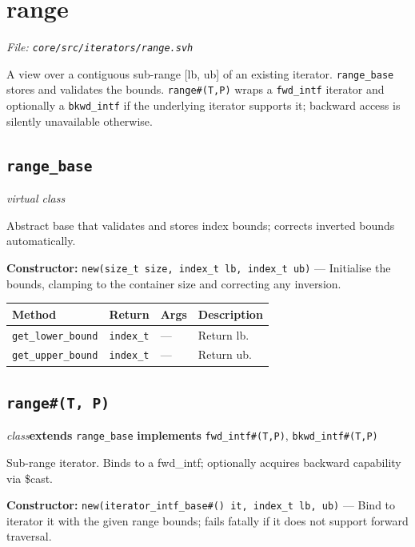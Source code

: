 \documentclass[11pt,letterpaper]{report}
\begin{document}
\section{range}
\noindent\small\textit{File: \texttt{core/src/iterators/range.svh}}\par

A view over a contiguous sub-range [lb, ub] of an existing iterator. \texttt{range\_base} stores and validates the bounds. \texttt{range\#(T,P)} wraps a \texttt{fwd\_intf} iterator and optionally a \texttt{bkwd\_intf} if the underlying iterator supports it; backward access is silently unavailable otherwise.

\subsection*{\texttt{range\_base}}
\noindent\small\textit{virtual class}\par

Abstract base that validates and stores index bounds; corrects inverted bounds automatically.

\noindent\textbf{Constructor:} \texttt{new(size\_t size, index\_t lb, index\_t ub)} --- Initialise the bounds, clamping to the container size and correcting any inversion.

\begin{xltabular}{\linewidth}{>{\small}p{1.35in} >{\small}p{1.25in} >{\small}p{0.95in} >{\small}X}
\toprule
\textbf{Method} & \textbf{Return} & \textbf{Args} & \textbf{Description} \\
\midrule
\endhead
\bottomrule
\endfoot
\texttt{get\_lower\_bound} & \texttt{index\_t} & --- & Return lb. \\
\texttt{get\_upper\_bound} & \texttt{index\_t} & --- & Return ub. \\
\end{xltabular}

\subsection*{\texttt{range\#(T, P)}}
\noindent\small\textit{class}\quad \textbf{extends} \texttt{range\_base} \quad \textbf{implements} \texttt{fwd\_intf\#(T,P)}, \texttt{bkwd\_intf\#(T,P)}\par

Sub-range iterator. Binds to a fwd\_intf; optionally acquires backward capability via \$cast.

\noindent\textbf{Constructor:} \texttt{new(iterator\_intf\_base\#() it, index\_t lb, ub)} --- Bind to iterator it with the given range bounds; fails fatally if it does not support forward traversal.
\end{document}
